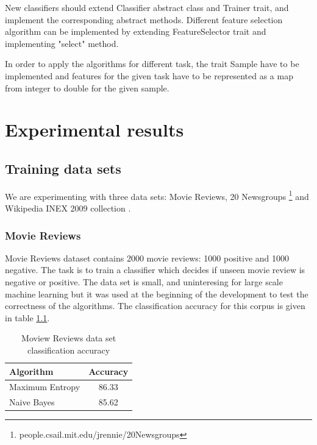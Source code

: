 \documentclass{report}
\begin{document}
New classifiers should extend Classifier abstract class and Trainer trait, and implement the corresponding abstract methods. Different feature selection algorithm can be implemented by extending FeatureSelector trait and implementing "select" method.

In order to apply the algorithms for different task, the trait Sample have to be implemented and features for the given task have to be represented as a map from integer to double for the given sample.

\chapter{Experimental results}

\section{Training data sets}

We are experimenting with three data sets: Movie Reviews\cite{Pang+Lee:04a}, 20 Newsgroups \footnote{people.csail.mit.edu/jrennie/20Newsgroups} and Wikipedia INEX 2009 collection \cite{conf/btw/SchenkelSK07}.

\subsection{Movie Reviews}

Movie Reviews dataset contains 2000 movie reviews: 1000 positive and 1000 negative. The task is to train a classifier which decides if unseen movie review is negative or positive. The data set is small, and uninteresing for large scale machine learning but it was used at the beginning of the development to test the correctness of the algorithms. The classification accuracy for this corpus is given in table \ref{table:mrprecision}. 

\begin{table}[ht]
\centering
\begin{tabular}{ l c }
    \hline\hline
    Algorithm & Accuracy \\ [0.2ex]
    \hline
    Maximum Entropy &  86.33 \\ %
    Naive Bayes & 85.62 \\ %
    \hline
  \end{tabular}
\label{table:mrprecision}
\caption{Moview Reviews data set classification accuracy}
\end{table}
\end{document}
